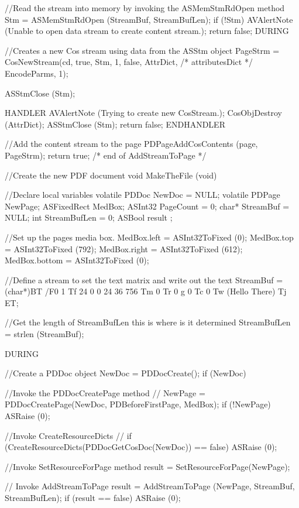 \documentclass[letterpaper,12pt,english,openany,oneside]{sphinxmanual}
\begin{document}
\begin{sphinxVerbatim}[commandchars=\\\{\}]
//Read the stream into memory by invoking the ASMemStmRdOpen method
Stm = ASMemStmRdOpen (StreamBuf, StreamBufLen);
if (!Stm)\PYGZob{}
  AVAlertNote (\PYGZdq{}Unable to open data stream to create content stream.\PYGZdq{});
  return false;
\PYGZcb{}
DURING

//Creates a new Cos stream using data from the ASStm object
PageStrm = CosNewStream(cd, true, Stm, \PYGZhy{}1,
  false,
  AttrDict, /* attributesDict */
  EncodeParms,
  \PYGZhy{}1);

ASStmClose (Stm);

HANDLER
  AVAlertNote (\PYGZdq{}Trying to create new CosStream.\PYGZdq{});
  CosObjDestroy (AttrDict);
  ASStmClose (Stm);
  return false;
END\PYGZus{}HANDLER


//Add the content stream to the page
PDPageAddCosContents (page, PageStrm);
return true;
\PYGZcb{} /* end of AddStreamToPage */


//Create the new PDF document
void MakeTheFile (void)

\PYGZob{}

//Declare local variables
volatile PDDoc NewDoc = NULL;
volatile PDPage NewPage;
ASFixedRect MedBox;
ASInt32 PageCount = 0;
char* StreamBuf = NULL;
int StreamBufLen = 0;
ASBool result ;

//Set up the page\PYGZsq{}s media box.
MedBox.left = ASInt32ToFixed (0);
MedBox.top = ASInt32ToFixed (792);
MedBox.right = ASInt32ToFixed (612);
MedBox.bottom = ASInt32ToFixed (0);

//Define a stream to set the text matrix and write out the text
StreamBuf = (char*)\PYGZdq{}BT /F0 1 Tf 24 0 0 24 36 756 Tm 0 Tr 0 g 0 Tc 0 Tw (Hello There) Tj ET\PYGZdq{};

//Get the length of StreamBufLen \PYGZhy{} this is where is it determined
StreamBufLen = strlen (StreamBuf);

DURING

//Create a PDDoc object
NewDoc = PDDocCreate();
  if (NewDoc) \PYGZob{}

//Invoke the PDDocCreatePage method
//  NewPage = PDDocCreatePage(NewDoc, PDBeforeFirstPage, MedBox);
      if (!NewPage)
          ASRaise (0);

//Invoke CreateResourceDicts
//  if (CreateResourceDicts(PDDocGetCosDoc(NewDoc)) == false)
          ASRaise (0);


//Invoke SetResourceForPage method
result = SetResourceForPage(NewPage);

// Invoke AddStreamToPage
result = AddStreamToPage (NewPage, StreamBuf, StreamBufLen);
  if (result == false)
      ASRaise (0);


\end{sphinxVerbatim}
\end{document}
